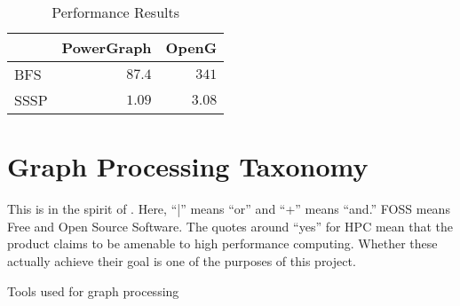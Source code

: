 \documentclass[11pt]{article}
\begin{document}
\begin{table}[htb]
	\centering
	\begin{tabular}{l|r|r|}
	 & PowerGraph & OpenG \\ \hline
	BFS & $87.4$ & $341$ \\ \hline
	SSSP & $1.09$ & $3.08$ \\ \hline
	\end{tabular}
	\caption{Performance Results}
	\label{tab:perf}
\end{table}

\section{Graph Processing Taxonomy}
This is in the spirit of \cite{Doekemeijer:2015:GPFSurvey}. Here, ``|'' means ``or'' and ``+'' means ``and.'' FOSS means Free and Open Source Software. The quotes around ``yes'' for HPC mean that the product claims to be amenable to high performance computing. Whether these actually achieve their goal is one of the purposes of this project.
\begin{table}
	\begin{minipage}{\linewidth} %
		\centering
		\caption{Tools used for graph processing}
		\label{tab:frameworks}
	\end{minipage}
\end{table}
\end{document}
